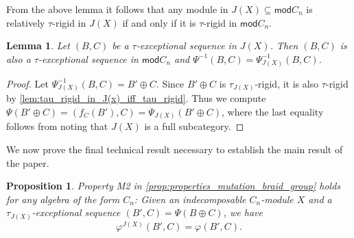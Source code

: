 \documentclass[11pt]{amsart}
\newcommand{\mods}{\mathsf{mod}}
\newtheorem{lemma}[theorem]{Lemma}
\newtheorem{proposition}[theorem]{Proposition}
\theoremstyle{definition}
\begin{document}
From the above lemma it follows that any module in $J(X) \subseteq \mods C_n$ is relatively $\tau$-rigid in $J(X)$ if and only if it is $\tau$-rigid in $\mods C_n$.

\begin{lemma}
   Let $(B,C)$ be a $\tau$-exceptional sequence in $J(X)$. Then $(B,C)$ is also a $\tau$-exceptional sequence in $\mods C_n$ and $\Psi^{-1}(B,C) = {\Psi^{-1}_{J(X)}}(B,C)$. 
\end{lemma}

\begin{proof}
    Let ${\Psi^{-1}_{J(X)}}(B,C) = B' \oplus C$. Since $B' \oplus C$ is $\tau_{J(X)}$-rigid, it is also $\tau$-rigid by \cref{lem:tau_rigid_in_J(x)_iff_tau_rigid}. Thus we compute $\Psi(B' \oplus C) = (f_C(B'),C) = {\Psi_{J(X)}}(B' \oplus C)$, where the last equality follows from noting that $J(X)$ is a full subcategory.
\end{proof}

We now prove the final technical result necessary to establish the main result of the paper.


\begin{proposition}\label{prop:property_2_cn}
    Property M2 in \cref{prop:properties_mutation_braid_group} holds for any algebra of the form $C_n$: Given an indecomposable $C_n$-module $X$ and a $\tau_{J(X)}$-exceptional sequence $(B',C) = \Psi(B \oplus C)$, we have \[\varphi^{J(X)}(B',C) = \varphi(B',C).\]
\end{proposition}
\end{document}
